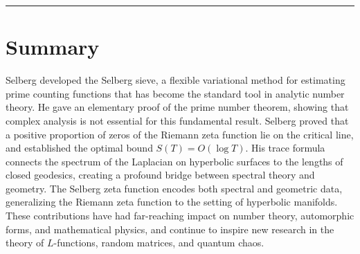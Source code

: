 \begin{center}\rule{0.5\linewidth}{0.5pt}\end{center}

\section*{Summary}

Selberg developed the Selberg sieve, a flexible variational method for estimating prime counting functions that has become the standard tool in analytic number theory. He gave an elementary proof of the prime number theorem, showing that complex analysis is not essential for this fundamental result. Selberg proved that a positive proportion of zeros of the Riemann zeta function lie on the critical line, and established the optimal bound $S(T) = O(\log T)$. His trace formula connects the spectrum of the Laplacian on hyperbolic surfaces to the lengths of closed geodesics, creating a profound bridge between spectral theory and geometry. The Selberg zeta function encodes both spectral and geometric data, generalizing the Riemann zeta function to the setting of hyperbolic manifolds. These contributions have had far-reaching impact on number theory, automorphic forms, and mathematical physics, and continue to inspire new research in the theory of $L$-functions, random matrices, and quantum chaos.
